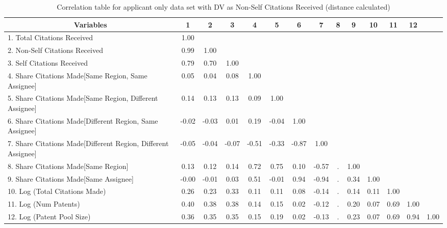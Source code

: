 \begin{table}[htbp]\centering \caption{Correlation table for applicant only data set with DV as Non-Self Citations Received (distance calculated)\label{a.ncorrelation}}
\footnotesize
\begin{adjustbox}{angle=90}
\begin{tabular}{l  c  c  c  c  c  c  c  c  c  c  c  c  c }\hline\hline
\multicolumn{1}{c}{Variables} &1&2&3&4&5&6&7&8&9&10&11&12\\ \hline
1. Total Citations Received&1.00\\
2. Non-Self Citations Received&0.99&1.00\\
3. Self Citations Received&0.79&0.70&1.00\\
4. Share Citations Made[Same Region, Same Assignee]&0.05&0.04&0.08&1.00\\
5. Share Citations Made[Same Region, Different Assignee]&0.14&0.13&0.13&0.09&1.00\\
6. Share Citations Made[Different Region, Same Assignee]&-0.02&-0.03&0.01&0.19&-0.04&1.00\\
7. Share Citations Made[Different Region, Different Assignee]&-0.05&-0.04&-0.07&-0.51&-0.33&-0.87&1.00\\
8. Share Citations Made[Same Region]&0.13&0.12&0.14&0.72&0.75&0.10&-0.57&   .&1.00\\
9. Share Citations Made[Same Assignee]&-0.00&-0.01&0.03&0.51&-0.01&0.94&-0.94&   .&0.34&1.00\\
10. Log (Total Citations Made)&0.26&0.23&0.33&0.11&0.11&0.08&-0.14&   .&0.14&0.11&1.00\\
11. Log (Num Patents)&0.40&0.38&0.38&0.14&0.15&0.02&-0.12&   .&0.20&0.07&0.69&1.00\\
12. Log (Patent Pool Size)&0.36&0.35&0.35&0.15&0.19&0.02&-0.13&   .&0.23&0.07&0.69&0.94&1.00\\
\hline \hline 
 \end{tabular}
  \end{adjustbox}
\end{table}
